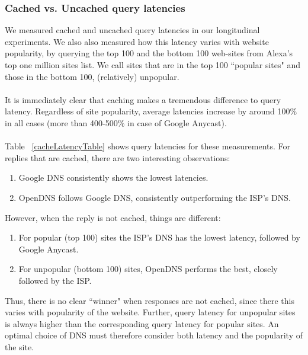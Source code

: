 \documentclass[twocolumn]{article}
\begin{document}
\subsubsection{Cached vs. Uncached query latencies}
We measured cached and uncached query latencies in our longitudinal experiments. We also also measured how this latency varies with website popularity, by querying the top 100 and the bottom 100 web-sites from Alexa's\cite{Alexa's} top one million sites list. We call sites that are in the top 100 ``popular sites" and those in the bottom 100, (relatively) unpopular.
\\
\\
It is immediately clear that caching makes a tremendous difference to query latency. Regardless of site popularity, average latencies increase by around 100\% in all cases (more than 400-500\% in case of Google Anycast).
\\
\\
Table ~\ref{cacheLatencyTable} shows query latencies for these measurements. For replies that are cached, there are two interesting observations:
\begin{enumerate}
\item Google DNS consistently shows the lowest latencies.
\item OpenDNS follows Google DNS, consistently outperforming the ISP's DNS.
\end{enumerate}
However, when the reply is not cached, things are different:
\begin{enumerate}
\item For popular (top 100) sites the ISP's DNS has the lowest latency, followed by Google Anycast.
\item For unpopular (bottom 100) sites, OpenDNS performs the best, closely followed by the ISP.
\end{enumerate}
Thus, there is no clear ``winner" when responses are not cached, since there this varies with popularity of the website. Further, query latency for unpopular sites is always higher than the corresponding query latency for popular sites. An optimal choice of DNS must therefore consider both latency and the popularity of the site.
\end{document}
